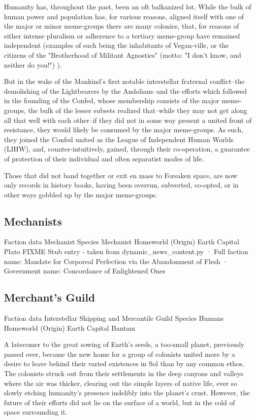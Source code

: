 Humanity has, throughout the past, been an oft balkanized lot. While
the bulk of human power and population has, for various reasons,
aligned itself with one of the major or minor meme-groups there are
many colonies, that, for reasons of either intense pluralism or
adherence to a tertiary meme-group have remained independent (examples
of such being the inhabitants of Vegan-ville, or the citizens of the
"Brotherhood of Militant Agnostics" (motto: "I don't know, and neither
do you!") ).

But in the wake of the Mankind's first notable interstellar fraternal
conflict--the demolishing of the Lightbearers by the Andolians--and
the efforts which followed in the founding of the Confed, whose
membership consists of the major meme-groups, the bulk of the lesser
subsets realized that--while they may not get along all that well with
each other--if they did not in some way present a united front of
resistance, they would likely be consumed by the major meme-groups. As
such, they joined the Confed united as the League of Independent Human
Worlds (LIHW), and, counter-intuitively, gained, through their
co-operation, a guarantee of protection of their individual and often
separatist modes of life.

Those that did not band together or exit en mass to Forsaken space,
are now only records in history books, having been overrun, subverted,
co-opted, or in other ways gobbled up by the major meme-groups.

\subsection{Mechanists}

Faction data 
Mechanist 
Species 	Mechanist 
Homeworld (Origin) 	Earth 
Capital 	Plato
FIXME Stub entry - taken from dynamic\_news\_content.py 
·	Full faction name: Mandate for Corporeal Perfection via the Abandonment of Flesh 
·	Government name: Concordance of Enlightened Ones 

\subsection{Merchant's Guild}

Faction data 
Interstellar Shipping and Mercantile Guild 
Species 	Humans 
Homeworld (Origin) 	Earth 
Capital 	Bantam 

A latecomer to the great sowing of Earth's seeds, a too-small planet,
previously passed over, became the new home for a group of colonists
united more by a desire to leave behind their varied existences in Sol
than by any common ethos. The colonists struck out from their
settlements in the deep canyons and valleys where the air was thicker,
clearing out the simple layers of native life, ever so slowly etching
humanity's presence indelibly into the planet's crust. However, the
future of their efforts did not lie on the surface of a world, but in
the cold of space surrounding it.


